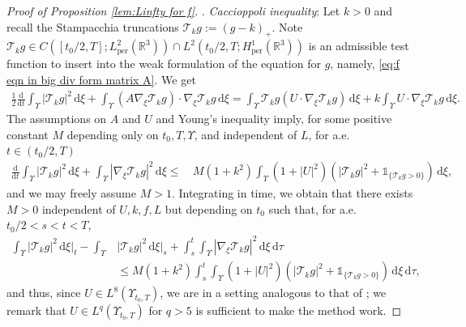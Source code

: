\documentclass[11pt,a4paper,reqno]{amsart}
\theoremstyle{remark}
\theoremstyle{definition}
\numberwithin{equation}{section}
\newcommand{\per}{\mathrm{per}}
\newcommand{\bxi}{\xi}
\renewcommand{\d}{\, \mathrm{d} }
\newcommand{\der}{\mathrm{d}}
\begin{document}
\begin{proof}[Proof of Proposition \ref{lem:Linfty for f}]
  . \textit{Caccioppoli inequality}: Let $k > 0$ and recall the Stampacchia truncations $\mathscr{T}_k g := (g-k)_+$. Note $\mathscr{T}_k g \in C([t_0/2,T];L^2_\per(\mathbb{R}^3)) \cap L^2(t_0/2,T;H^1_\per(\mathbb{R}^3))$ is an admissible test function to insert into the weak formulation of the equation for $g$, namely, \eqref{eq:f eqn in big div form matrix A}. We get 
    \begin{equation*}
        \begin{aligned}
            \frac{1}{2}\frac{\der}{\der t}\int_{\Upsilon} |\mathscr{T}_k g|^2 \d \bxi \!+\!\int_{\Upsilon} (A\nabla_{\bxi}\mathscr{T}_k g) \cdot \nabla_{\bxi} \mathscr{T}_k g \d \bxi = \int_{\Upsilon} \mathscr{T}_k g (U \cdot \nabla_{\bxi} \mathscr{T}_k g) \d \bxi + k\int_{\Upsilon} U \cdot \nabla_{\bxi} \mathscr{T}_k g \d \bxi. 
        \end{aligned}
    \end{equation*}
The assumptions on $A$ and $U$ and Young's inequality imply, for some positive constant $M$ depending only on $t_0,T,\Upsilon$, and independent of $L$, for a.e.~$t \in (t_0/2,T)$ 
\begin{equation*}
            \begin{aligned}
            \frac{\der}{\der t}\int_{\Upsilon} |\mathscr{T}_k g|^2 \d \bxi +\int_{\Upsilon} |\nabla_{\bxi} \mathscr{T}_k g |^2 \d \bxi\leq & \, M(1+k^2) \int_{\Upsilon}  (1 + |U|^2) (|\mathscr{T}_k g|^2 + \mathds{1}_{\{\mathscr{T}_k g>0\}}) \d \bxi,  
        \end{aligned}
\end{equation*}
and we may freely assume $M>1$. Integrating in time, we obtain that there exists $M>0$ independent of $U,k,f,L$ but depending on $t_0$ such that, for a.e.~$t_0/2<s<t<T$, 
\begin{equation}\label{eq:caccioppoli}
            \begin{aligned}
            \int_{\Upsilon} |\mathscr{T}_k g|^2 \d \bxi\bigg|_{t} - \int_{\Upsilon} & |\mathscr{T}_k g|^2 \d \bxi\bigg|_{s} + \int_s^t \int_{\Upsilon} |\nabla_{\bxi} \mathscr{T}_k g |^2 \d \bxi \d \tau \\ 
            &\leq M(1+k^2) \int_s^t \int_{\Upsilon} (1 + |U|^2) (|\mathscr{T}_k g|^2 + \mathds{1}_{\{\mathscr{T}_k g>0\}}) \d \bxi \d \tau, 
        \end{aligned}
\end{equation}
and thus, since $U \in L^8(\Upsilon_{t_0,T})$, we are in a setting analogous to that of \cite[\S 3.2]{reg1}; we remark that $U \in L^q(\Upsilon_{t_0,T})$ for $q > 5$ is sufficient to make the method work. 


\end{proof}
\end{document}
